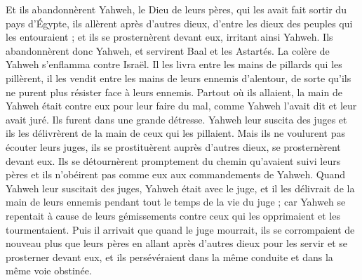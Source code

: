 \begin{multicols}{2}
Et ils abandonnèrent Yahweh, le Dieu de leurs pères, qui les avait fait sortir du pays d'Égypte, ils allèrent après d'autres dieux, d'entre les dieux des peuples qui les entouraient ; et ils se prosternèrent devant eux, irritant ainsi Yahweh.
Ils abandonnèrent donc Yahweh, et servirent Baal et les Astartés.
La colère de Yahweh s'enflamma contre Israël. Il les livra entre les mains de pillards qui les pillèrent, il les vendit entre les mains de leurs ennemis d'alentour, de sorte qu'ils ne purent plus résister face à leurs ennemis.
Partout où ils allaient, la main de Yahweh était contre eux pour leur faire du mal, comme Yahweh l'avait dit et leur avait juré. Ils furent dans une grande détresse.
Yahweh leur suscita des juges et ils les délivrèrent de la main de ceux qui les pillaient.
Mais ils ne voulurent pas écouter leurs juges, ils se prostituèrent auprès d'autres dieux, se prosternèrent devant eux. Ils se détournèrent promptement du chemin qu'avaient suivi leurs pères et ils n'obéirent pas comme eux aux commandements de Yahweh.
Quand Yahweh leur suscitait des juges, Yahweh était avec le juge, et il les délivrait de la main de leurs ennemis pendant tout le temps de la vie du juge ; car Yahweh se repentait à cause de leurs gémissements contre ceux qui les opprimaient et les tourmentaient.
Puis il arrivait que quand le juge mourrait, ils se corrompaient de nouveau plus que leurs pères en allant après d'autres dieux pour les servir et se prosterner devant eux, et ils persévéraient dans la même conduite et dans la même voie obstinée.

\end{multicols}
